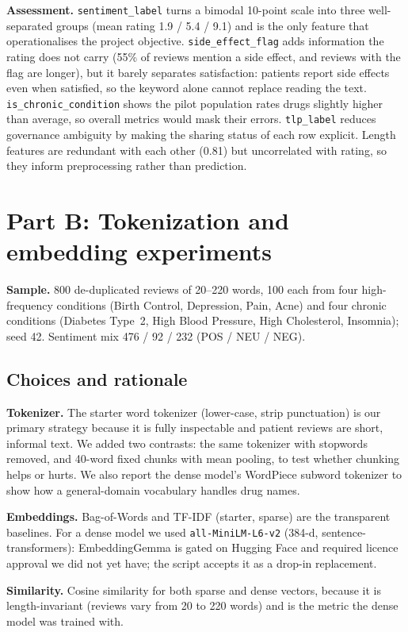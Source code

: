 \documentclass[11pt]{article}
\newcommand{\code}[1]{\texttt{#1}}
\begin{document}
\textbf{Assessment.} \code{sentiment\_label} turns a bimodal 10-point scale into three well-separated groups (mean rating 1.9 / 5.4 / 9.1) and is the only feature that operationalises the project objective. \code{side\_effect\_flag} adds information the rating does not carry (55\% of reviews mention a side effect, and reviews with the flag are longer), but it barely separates satisfaction: patients report side effects even when satisfied, so the keyword alone cannot replace reading the text. \code{is\_chronic\_condition} shows the pilot population rates drugs slightly higher than average, so overall metrics would mask their errors. \code{tlp\_label} reduces governance ambiguity by making the sharing status of each row explicit. Length features are redundant with each other (0.81) but uncorrelated with rating, so they inform preprocessing rather than prediction.

\section{Part B: Tokenization and embedding experiments}
\textbf{Sample.} 800 de-duplicated reviews of 20--220 words, 100 each from four high-frequency conditions (Birth Control, Depression, Pain, Acne) and four chronic conditions (Diabetes Type~2, High Blood Pressure, High Cholesterol, Insomnia); seed 42. Sentiment mix 476 / 92 / 232 (POS / NEU / NEG).

\subsection{Choices and rationale}
\textbf{Tokenizer.} The starter word tokenizer (lower-case, strip punctuation) is our primary strategy because it is fully inspectable and patient reviews are short, informal text. We added two contrasts: the same tokenizer with stopwords removed, and 40-word fixed chunks with mean pooling, to test whether chunking helps or hurts. We also report the dense model's WordPiece subword tokenizer to show how a general-domain vocabulary handles drug names.

\textbf{Embeddings.} Bag-of-Words and TF-IDF (starter, sparse) are the transparent baselines. For a dense model we used \code{all-MiniLM-L6-v2} (384-d, sentence-transformers): EmbeddingGemma is gated on Hugging Face and required licence approval we did not yet have; the script accepts it as a drop-in replacement.

\textbf{Similarity.} Cosine similarity for both sparse and dense vectors, because it is length-invariant (reviews vary from 20 to 220 words) and is the metric the dense model was trained with.
\end{document}
